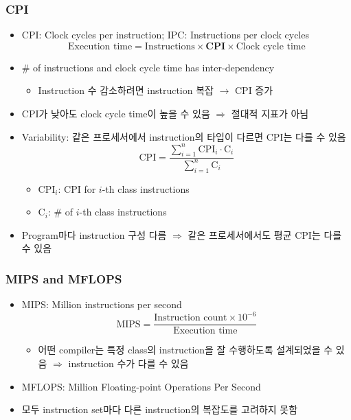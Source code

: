 \subsubsection*{CPI}
\begin{itemize}
    \item CPI: Clock cycles per instruction; IPC: Instructions per clock cycles
    \begin{equation}
        \text{Execution~time}=\text{Instructions}\times\textbf{CPI}\times\text{Clock~cycle~time}
    \end{equation}
    \item \# of instructions and clock cycle time has inter-dependency
    \begin{itemize}
        \item Instruction 수 감소하려면 instruction 복잡 $\rightarrow$ CPI 증가
    \end{itemize}
    \item CPI가 낮아도 clock cycle time이 높을 수 있음 $\Rightarrow$ 절대적 지표가 아님
    \item Variability: 같은 프로세서에서 instruction의 타입이 다르면 CPI는 다를 수 있음
    \begin{equation}
        \text{CPI}=\frac{\sum_{i=1}^{n}\text{CPI}_i\cdot\text{C}_i}{\sum_{i=1}^{n}\text{C}_i}
    \end{equation}
    \begin{itemize}
        \item $\text{CPI}_i$: CPI for $i$-th class instructions
        \item $\text{C}_i$: \# of $i$-th class instructions
    \end{itemize}
    \item Program마다 instruction 구성 다름 $\Rightarrow$ 같은 프로세서에서도 평균 CPI는 다를 수 있음
\end{itemize}

\subsubsection*{MIPS and MFLOPS}
\begin{itemize}
    \item MIPS: Million instructions per second
    \begin{equation}
        \text{MIPS}=\frac{\text{Instruction~count}\times 10^{-6}}{\text{Execution time}}
    \end{equation}
    \begin{itemize}
        \item 어떤 compiler는 특정 class의 instruction을 잘 수행하도록 설계되었을 수 있음 $\Rightarrow$ instruction 수가 다를 수 있음
    \end{itemize}
    \item MFLOPS: Million Floating-point Operations Per Second
    \item 모두 instruction set마다 다른 instruction의 복잡도를 고려하지 못함
\end{itemize}

